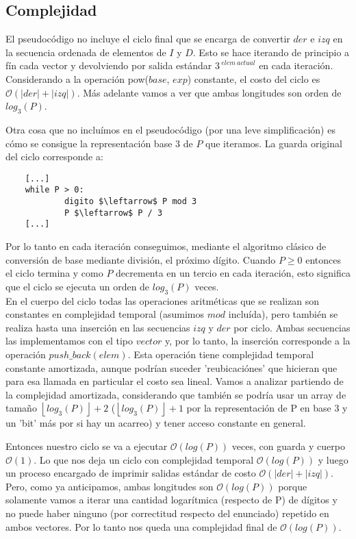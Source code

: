\newpage
\subsection{Complejidad}
	El pseudocódigo no incluye el ciclo final que se encarga de convertir $der$ e $izq$ en la secuencia ordenada de elementos de $I$ y $D$. Esto se hace iterando de principio a fín cada vector y devolviendo por salida estándar $3^{\ elem \ actual}$ en cada iteración. Considerando a la operación pow($base$, $exp$) constante, el costo del ciclo es $\mathcal{O} (|der| + |izq|)$. Más adelante vamos a ver que ambas longitudes son orden de $log_3(P)$.
	
	Otra cosa que no incluímos en el pseudocódigo (por una leve simplificación) es cómo se consigue la representación base 3 de $P$ que iteramos. La guarda original del ciclo corresponde a:
	
	\begin{lstlisting}
	[...]
	while P > 0:
        	digito $\leftarrow$ P mod 3
        	P $\leftarrow$ P / 3
	[...]
	\end{lstlisting}
	
	Por lo tanto en cada iteración conseguimos, mediante el algoritmo clásico de conversión de base mediante división, el próximo dígito. Cuando $P \geq 0$ entonces el ciclo termina y como $P$ decrementa en un tercio en cada iteración, esto significa que el ciclo se ejecuta un orden de $log_3(P)$ veces. 
	\\
	
	En el cuerpo del ciclo todas las operaciones aritméticas que se realizan son constantes en complejidad temporal (asumimos $mod$ incluída), pero también se realiza hasta una inserción en las secuencias $izq$ y $der$ por ciclo. Ambas secuencias las implementamos con el tipo $vector$ y, por lo tanto, la inserción corresponde a la operación $push\_back(elem)$. Esta operación tiene complejidad temporal constante amortizada, aunque podrían suceder 'reubicaciónes' que hicieran que para esa llamada en particular el costo sea lineal. Vamos a analizar partiendo de la complejidad amortizada, considerando que también se podría usar un array de tamaño $\left \lfloor{log_3(P)}\right \rfloor + 2$ ($\left \lfloor{log_3(P)}\right \rfloor + 1$ por la representación de P en base 3 y un 'bit' más por si hay un acarreo) y tener acceso constante en general.
	
	Entonces nuestro ciclo se va a ejecutar $\mathcal{O} (log(P))$ veces, con guarda y cuerpo $\mathcal{O} (1)$. Lo que nos deja un ciclo con complejidad temporal $\mathcal{O} (log(P))$ y luego un proceso encargado de imprimir salidas estándar de costo $\mathcal{O} (|der| + |izq|)$. Pero, como ya anticipamos, ambas longitudes son $\mathcal{O} (log(P))$ porque solamente vamos a iterar una cantidad logarítmica (respecto de P) de dígitos y no puede haber ninguno (por correctitud respecto del enunciado) repetido en ambos vectores. Por lo tanto nos queda una complejidad final de $\mathcal{O} (log(P))$.
	\\
	

